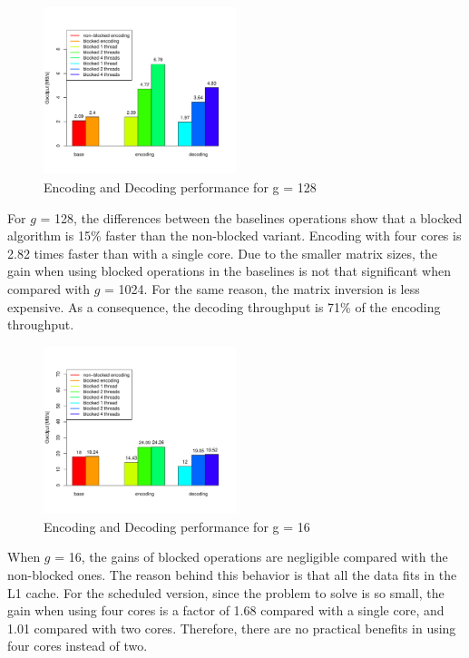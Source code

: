 \begin{figure}[ht!]
\centering
\includegraphics[width=0.5\textwidth]{images/2015-04-18_encoding_decoding_128.pdf}
\caption{Encoding and Decoding performance for g = 128 \cite{wunderlich2015network}}
\label{enc_dec128}
\end{figure}

For $g$ = 128, the differences between the baselines operations show that a
blocked algorithm is 15\% faster than the non-blocked variant. Encoding with
four cores is 2.82 times faster than with a single core. Due to the smaller
matrix sizes, the gain when using blocked operations in the baselines is not
that significant when compared with $g$ = 1024. For the same reason, the matrix
inversion is less expensive. As a consequence, the decoding throughput is 71\%
of the encoding throughput.

\begin{figure}[ht!]
\centering
\includegraphics[width=0.5\textwidth]{images/2015-04-18_encoding_decoding_16.pdf}
\caption{Encoding and Decoding performance for g = 16 \cite{wunderlich2015network}}
\label{enc_dec16}
\end{figure}

When $g$ = 16, the gains of blocked operations are negligible compared with
the non-blocked ones. The reason behind this behavior is that all the data
fits in the L1 cache. For the scheduled version, since the problem to solve
is so small, the gain when using four cores is a factor of 1.68 compared
with a single core, and 1.01 compared with two cores. Therefore, there
are no practical benefits in using four cores instead of two.


